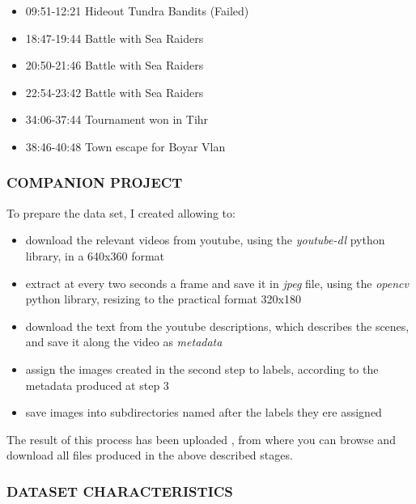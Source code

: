 \documentclass[
]{article}
\providecommand{\tightlist}{%
  \setlength{\itemsep}{0pt}\setlength{\parskip}{0pt}}
\newcommand{\hhref}[3][blue]{\href{#2}{\color{#1}{#3}}}%
\begin{document}
\begin{itemize}
\tightlist
\item
  09:51-12:21 Hideout Tundra Bandits (Failed)
\item
  18:47-19:44 Battle with Sea Raiders
\item
  20:50-21:46 Battle with Sea Raiders
\item
  22:54-23:42 Battle with Sea Raiders
\item
  34:06-37:44 Tournament won in Tihr
\item
  38:46-40:48 Town escape for Boyar Vlan
\end{itemize}

\hypertarget{companion-projects}{%
\subsubsection{COMPANION PROJECT}\label{companion-projects}}

To prepare the data set, I created \hhref{https://github.com/diegoami/DA_split_youtube_frames\_s3/}{a companion project} allowing to:

\begin{itemize}
\tightlist
\item
  download the relevant videos from youtube, using the
  \emph{youtube-dl} python library, in a 640x360 format
\item
  extract at every two seconds a frame and save it in \emph{jpeg} file, using
  the \emph{opencv} python library, resizing to the practical format
  320x180
\item
  download the text from the youtube descriptions, which describes the scenes, and save it along the
  video as \emph{metadata}
\item
  assign the images created in the second step to labels, according to the metadata produced at step 3
\item 
  save images into subdirectories named after the labels they ere assigned   
\end{itemize}


The result of this process has been uploaded \hhref{https://da-youtube-ml.s3.eu-central-1.amazonaws.com/}{to a public bucket on Amazon S3}, from where you can browse and download all files produced in the above described stages.

\hypertarget{dataset-characteristics}{%
\subsubsection{DATASET CHARACTERISTICS}\label{dataset-characteristics}}
\end{document}
